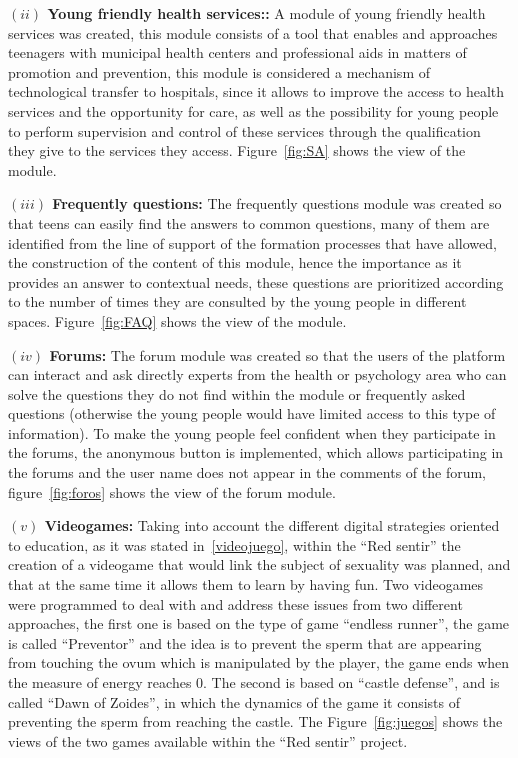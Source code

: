 \documentclass[journal,transmag]{IEEEtran}
\begin{document}
\textbf{$(ii)$ Young friendly health services::} A module of young friendly health services was created, this module consists of a tool that enables and approaches teenagers with municipal health centers and professional aids in matters of promotion and prevention, this module is considered a mechanism of technological transfer to hospitals, since it allows to improve the access to health services and the opportunity for care, as well as the possibility for young people to perform supervision and control of these services through the qualification they give to the services they access. Figure~\ref{fig:SA} shows the view of the module.

\textbf{$(iii)$ Frequently questions:} The frequently questions module was created so that teens can easily find the answers to common questions, many of them are identified from the line of support of the formation processes that have allowed, the construction of the content of this module, hence the importance as it provides an answer to contextual needs, these questions are prioritized according to the number of times they are consulted by the young people in different spaces. Figure~\ref{fig:FAQ} shows the view of the module.

\textbf{$(iv)$ Forums:} The forum module was created so that the users of the platform can interact and ask directly experts from the health or psychology area who can solve the questions they do not find within the module or frequently asked questions (otherwise the young people would have limited access to this type of information). To make the young people feel confident when they participate in the forums, the anonymous button is implemented, which allows participating in the forums and the user name does not appear in the comments of the forum, figure~\ref{fig:foros} shows the view of the forum module.

\textbf{$(v)$ Videogames:} Taking into account the different digital strategies oriented to education, as it was stated in~\ref{videojuego}, within the ``Red sentir'' the creation of a videogame that would link the subject of sexuality was planned, and that at the same time it allows them to learn by having fun. Two videogames were programmed to deal with and address these issues from two different approaches, the first one is based on the type of game ``endless runner'', the game is called ``Preventor'' and the idea is to prevent the sperm that are appearing from touching the ovum which is manipulated by the player, the game ends when the measure of energy reaches $0$. The second is based on ``castle defense'', and is called ``Dawn of Zoides'', in which the dynamics of the game it consists of preventing the sperm from reaching the castle. The Figure~\ref{fig:juegos} shows the views of the two games available within the ``Red sentir'' project.
\end{document}
